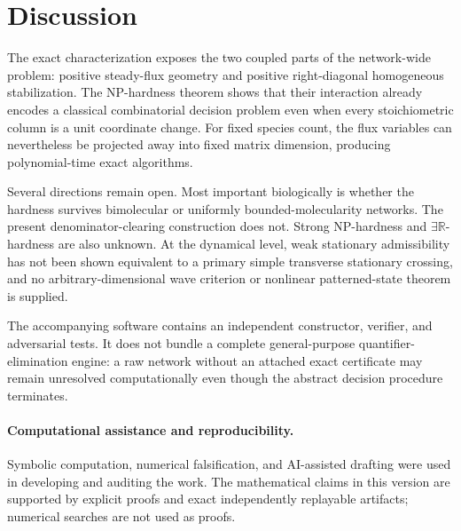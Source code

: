 \documentclass[11pt]{article}
\theoremstyle{definition}
\newcommand{\R}{\mathbb R}
\begin{document}
\section{Discussion}

The exact characterization exposes the two coupled parts of the network-wide
problem: positive steady-flux geometry and positive right-diagonal homogeneous
stabilization.  The NP-hardness theorem shows that their interaction already
encodes a classical combinatorial decision problem even when every
stoichiometric column is a unit coordinate change.  For fixed species count,
the flux variables can nevertheless be projected away into fixed matrix
dimension, producing polynomial-time exact algorithms.

Several directions remain open.  Most important biologically is whether the
hardness survives bimolecular or uniformly bounded-molecularity networks.  The
present denominator-clearing construction does not.  Strong NP-hardness and
$\exists\R$-hardness are also unknown.  At the dynamical level, weak
stationary admissibility has not been shown equivalent to a primary simple
transverse stationary crossing, and no arbitrary-dimensional wave criterion
or nonlinear patterned-state theorem is supplied.

The accompanying software contains an independent constructor, verifier, and
adversarial tests.  It does not bundle a complete general-purpose
quantifier-elimination engine: a raw network without an attached exact
certificate may remain unresolved computationally even though the abstract
decision procedure terminates.

\paragraph{Computational assistance and reproducibility.}
Symbolic computation, numerical falsification, and AI-assisted drafting were
used in developing and auditing the work.  The mathematical claims in this
version are supported by explicit proofs and exact independently replayable
artifacts; numerical searches are not used as proofs.

\begingroup
\small


\endgroup
\end{document}
